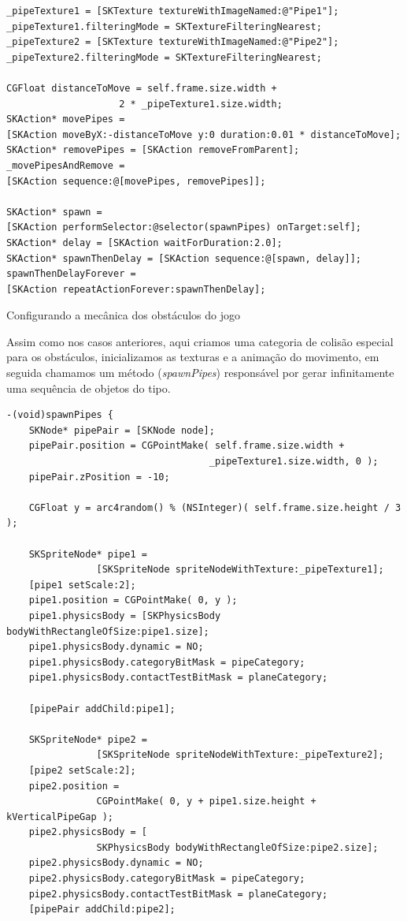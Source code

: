 \documentclass[a4paper,12pt,brazil,doubleside]{book}
\begin{document}
\begin{singlespace}
\begin{listing}[H]
\begin{verbatim}
_pipeTexture1 = [SKTexture textureWithImageNamed:@"Pipe1"];
_pipeTexture1.filteringMode = SKTextureFilteringNearest;
_pipeTexture2 = [SKTexture textureWithImageNamed:@"Pipe2"];
_pipeTexture2.filteringMode = SKTextureFilteringNearest;
        
CGFloat distanceToMove = self.frame.size.width + 
					2 * _pipeTexture1.size.width;
SKAction* movePipes = 
[SKAction moveByX:-distanceToMove y:0 duration:0.01 * distanceToMove];
SKAction* removePipes = [SKAction removeFromParent];
_movePipesAndRemove = 
[SKAction sequence:@[movePipes, removePipes]];
        
SKAction* spawn = 
[SKAction performSelector:@selector(spawnPipes) onTarget:self];
SKAction* delay = [SKAction waitForDuration:2.0];
SKAction* spawnThenDelay = [SKAction sequence:@[spawn, delay]];
spawnThenDelayForever = 
[SKAction repeatActionForever:spawnThenDelay];       
\end{verbatim}
\caption{Configurando a mecânica dos obstáculos do jogo}
\end{listing}

Assim como nos casos anteriores, aqui criamos uma categoria de colisão especial para os obstáculos, inicializamos as texturas e a animação do movimento, em seguida chamamos um método (\emph{spawnPipes}) responsável por gerar infinitamente uma sequência de objetos do tipo.

\begin{listing}[H]
\begin{verbatim}
-(void)spawnPipes {
    SKNode* pipePair = [SKNode node];
    pipePair.position = CGPointMake( self.frame.size.width + 
    								_pipeTexture1.size.width, 0 );
    pipePair.zPosition = -10;
    
    CGFloat y = arc4random() % (NSInteger)( self.frame.size.height / 3 );
    
    SKSpriteNode* pipe1 = 
    			[SKSpriteNode spriteNodeWithTexture:_pipeTexture1];
    [pipe1 setScale:2];
    pipe1.position = CGPointMake( 0, y );
    pipe1.physicsBody = [SKPhysicsBody bodyWithRectangleOfSize:pipe1.size];
    pipe1.physicsBody.dynamic = NO;
    pipe1.physicsBody.categoryBitMask = pipeCategory;
    pipe1.physicsBody.contactTestBitMask = planeCategory;
    
    [pipePair addChild:pipe1];
    
    SKSpriteNode* pipe2 = 
    			[SKSpriteNode spriteNodeWithTexture:_pipeTexture2];
    [pipe2 setScale:2];
    pipe2.position = 
    			CGPointMake( 0, y + pipe1.size.height + kVerticalPipeGap );
    pipe2.physicsBody = [
    			SKPhysicsBody bodyWithRectangleOfSize:pipe2.size];
    pipe2.physicsBody.dynamic = NO;
    pipe2.physicsBody.categoryBitMask = pipeCategory;
    pipe2.physicsBody.contactTestBitMask = planeCategory;
    [pipePair addChild:pipe2];
    

\end{verbatim}
\end{listing}
\end{singlespace}
\end{document}
